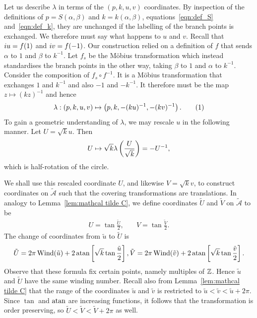 \documentclass{article}
\begin{document}
Let us describe $\lambda$ in terms of the $(p,k,u,v)$ coordinates.
By inspection of the definitions of $p = S(\alpha,\beta)$ and $k = k(\alpha,\beta)$, equations~\eqref{eqn:def_S} and~\eqref{eqn:def_k}, they are unchanged if the labelling of the branch points is exchanged. We therefore must say what happens to $u$ and $v$. Recall that $i u = f(1)$ and $i v = f(-1)$. Our construction relied on a definition of $f$ that sends $\alpha$ to $1$ and $\beta$ to $k^{-1}$. Let $f_s$ be the M\"obius transformation which instead standardises the branch points in the other way, taking $\beta$ to $1$ and $\alpha$ to $k^{-1}$. Consider the composition of $f_s \circ f^{-1}$. It is a M\"obius transformation that exchanges $1$ and $k^{-1}$ and also $-1$ and $-k^{-1}$. It therefore must be the map $z \mapsto (kz)^{-1}$ and hence
\[
\lambda: (p,k,u,v) \mapsto \bra{ p,k, -(ku)^{-1}, -(kv)^{-1} }.
\labelthis{eqn:def_lambda}
\]
To gain a geometric understanding of $\lambda$, we may rescale $u$ in the following manner. Let $U=\sqrt{k} u$. Then
\[
U
\mapsto \sqrt{k} \lambda\left(\frac{U}{\sqrt{k}} \right)
= -U^{-1},
\]
which is half-rotation of the circle.


We shall use this rescaled coordinate $U$, and likewise $V = \sqrt{k} v$, to construct coordinates on $\mathcal{\tilde{A}}$ such that the covering transformations are translations. 
In analogy to Lemma~\ref{lem:mathcal tilde C}, we define coordinates $\tilde{U}$ and $\tilde{V}$ on $\mathcal{\tilde{A}}$ to be
\begin{align*}
U = \tan \frac{\tilde{U}}{2},       &\quad
V = \tan \frac{\tilde{V}}{2}.       
\end{align*}
The change of coordinates from $\tilde{u}$ to $\tilde{U}$ is
\[
\tilde{U} = 2\pi\operatorname{Wind}(\tilde{u}) + 2 \operatorname{atan} \left[ \sqrt{k} \tan \frac{\tilde{u}}{2} \right],
\tilde{V} = 2\pi\operatorname{Wind}(\tilde{v}) + 2 \operatorname{atan} \left[ \sqrt{k} \tan \frac{\tilde{v}}{2} \right].
\]
Observe that these formula fix certain points, namely multiples of $\mathbb{Z}$.
Hence $\tilde{u}$ and $\tilde{U}$ have the same winding number.
Recall also from Lemma~\ref{lem:mathcal tilde C} that the range of the coordinates $\tilde{u}$ and $\tilde{v}$ is restricted to $\tilde{u} < \tilde{v} < \tilde{u} + 2\pi$.
Since $\tan$ and $\operatorname{atan}$ are increasing functions, it follows that the transformation is order preserving, so $\tilde{U} < \tilde{V} < \tilde{V} + 2\pi$ as well.
\end{document}
